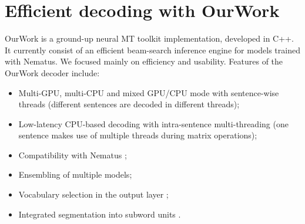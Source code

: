 \documentclass[11pt]{article}
\begin{document}
\section{Efficient decoding with OurWork}
OurWork is a ground-up neural MT toolkit implementation, developed in C++. It currently consist of an efficient beam-search inference engine for models trained with Nematus. We focused mainly on efficiency and usability. Features of the OurWork decoder include:

\begin{itemize}
 \item Multi-GPU, multi-CPU and mixed GPU/CPU mode with sentence-wise threads (different sentences are decoded in different threads);
  \item Low-latency CPU-based decoding with intra-sentence multi-threading (one sentence makes use of multiple threads during matrix operations);
 \item Compatibility with Nematus \cite{DBLP:conf/wmt/SennrichHB16};
 \item Ensembling of multiple models;
 \item Vocabulary selection in the output layer \cite{DBLP:conf/acl/JeanCMB15,DBLP:conf/acl/MiWI16};
 \item Integrated segmentation into subword units \cite{DBLP:journals/corr/SennrichHB15}.
\end{itemize}
\end{document}
